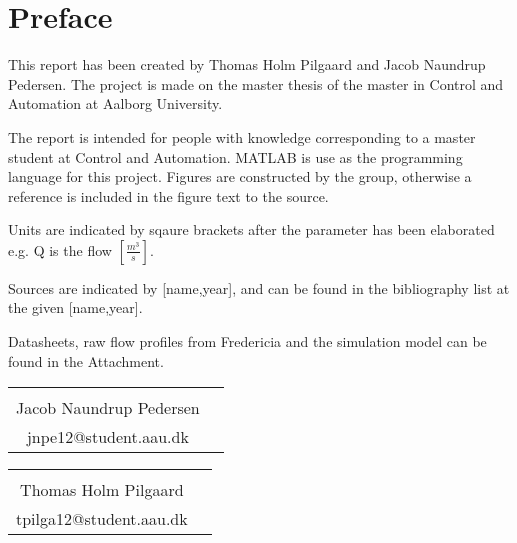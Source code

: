 \chapter*{Preface}
This report has been created by Thomas Holm Pilgaard and Jacob Naundrup Pedersen. The project is made on the master thesis of the master in Control and Automation at Aalborg University. 

The report is intended for people with knowledge corresponding to a master student at Control and Automation. MATLAB is use as the programming language for this project. Figures are constructed by the group, otherwise a reference is included in the figure text to the source.  

Units are indicated by sqaure brackets after the parameter has been elaborated e.g. Q is the flow $\left[\frac{m^3}{s}\right]$. 

Sources are indicated by [name,year], and can be found in the bibliography list at the given
[name,year].

Datasheets, raw flow profiles from Fredericia and the simulation model can be found in the Attachment.

\vfill

\begin{table}[H]
	\centering
		\begin{tabular}{c c }
			\underline{\phantom{mmmmmmmmmmmmmmmmmmm}}       \\
			Jacob Naundrup Pedersen \\
			jnpe12@student.aau.dk \\


		\end{tabular}
				\begin{tabular}{c c }
			\underline{\phantom{mmmmmmmmmmmmmmmmmmm}}       \\
			Thomas Holm Pilgaard \\
			tpilga12@student.aau.dk\\

			
		\end{tabular}
		
\end{table}

